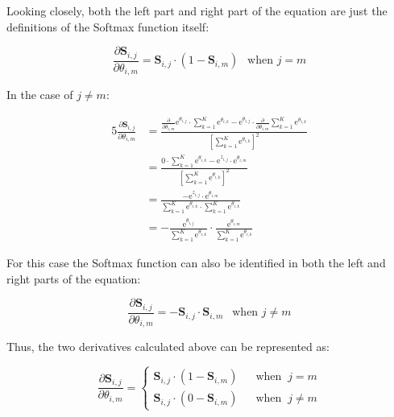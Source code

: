 \documentclass[a4paper]{article}
\newcommand{\euler}{\mathrm{e}}
\newcommand{\matr}[1]{\mathbf{#1}}
\begin{document}
Looking closely, both the left part and right part of the equation are just the definitions of the Softmax function itself:

\begin{equation*}
    \frac{\partial \matr{S}_{i,j}}{\partial \theta_{i,m}} = \matr{S}_{i,j} \cdot (1 - \matr{S}_{i,m}) ~~ \text{ when } j=m
\end{equation*}

In the case of $j\not=m$:

\begin{alignat*}{5}
    \frac{\partial \matr{S}_{i,j}}{\partial \theta_{i,m}} &= \frac{\frac{\partial}{\partial \theta_{i,m}} \euler^{\theta_{i,j}} \cdot \sum_{k=1}^{K} \euler^{\theta_{i,k}} - \euler^{\theta_{i,j}} \cdot \frac{\partial}{\partial \theta_{i,m}} \sum_{k=1}^{K} \euler^{\theta_{i,k}}}{[\sum_{k=1}^{K} \euler^{\theta_{i,k}}]^2} \\
    &= \frac{0 \cdot \sum_{k=1}^{K}\euler^{\theta_{i,k}} - \euler^{{z}_{i,j}} \cdot \euler^{\theta_{i,m}}}{[\sum_{k=1}^{K} \euler^{\theta_{i,k}}]^2} \\
    &= \frac{- \euler^{{z}_{i,j}} \cdot \euler^{\theta_{i,m}}}{\sum_{k=1}^{K} \euler^{\theta_{i,k}} \cdot \sum_{k=1}^{K} \euler^{\theta_{i,k}}} \\
    &= -\frac{\euler^{\theta_{i,j}}}{\sum_{k=1}^{K} \euler^{\theta_{i,k}}} \cdot \frac{\euler^{\theta_{i,m}}}{\sum_{k=1}^{K} \euler^{\theta_{i,k}}}
\end{alignat*}

For this case the Softmax function can also be identified in both the left and right parts of the equation:

\begin{equation*}
    \frac{\partial \matr{S}_{i,j}}{\partial \theta_{i,m}} = -\matr{S}_{i,j} \cdot \matr{S}_{i,m} ~~ \text{ when } j\not=m
\end{equation*}

Thus, the two derivatives calculated above can be represented as:

\begin{equation*}
    \frac{\partial\matr{S}_{i,j}}{\partial\theta_{i,m}} = 
    \begin{cases}
        \matr{S}_{i,j} \cdot (1 - \matr{S}_{i,m}) & ~~ \text{ when } ~ j = m \\
        \matr{S}_{i,j} \cdot (0 - \matr{S}_{i,m}) & ~~ \text{ when } ~ j \not= m
      \end{cases}       
\end{equation*}
\end{document}
